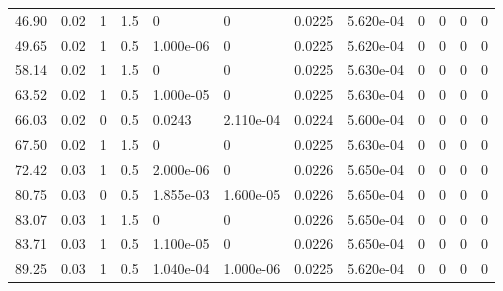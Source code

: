 \documentclass[preview]{standalone}
\begin{document}
{{\begin{tabular}{L{1.2cm}C{1.2cm} C{0.3cm}C{0.5cm} C{1.4cm}C{1.4cm} C{1.4cm}C{1.4cm} C{1.6cm}C{1.6cm} C{1.6cm}C{1.6cm}}
  46.90  &  0.02  & 1     & 1.5 &  0  & 0  &  0.0225&   5.620e-04& 0 & 0   &  0 & 0  \\ 
  49.65  &  0.02  & 1     & 0.5 &  1.000e-06  & 0  &  0.0225&   5.620e-04& 0 & 0   &  0 & 0  \\ 
  58.14  &  0.02  & 1     & 1.5 &  0  & 0  &  0.0225&   5.630e-04& 0 & 0   &  0 & 0  \\ 
  63.52  &  0.02  & 1     & 0.5 &  1.000e-05  & 0  &  0.0225&   5.630e-04& 0 & 0   &  0 & 0  \\ 
  66.03  &  0.02  & 0     & 0.5 &  0.0243  & 2.110e-04  &  0.0224&   5.600e-04& 0 & 0   &  0 & 0  \\ 
  67.50  &  0.02  & 1     & 1.5 &  0  & 0  &  0.0225&   5.630e-04& 0 & 0   &  0 & 0  \\ 
  72.42  &  0.03  & 1     & 0.5 &  2.000e-06  & 0  &  0.0226&   5.650e-04& 0 & 0   &  0 & 0  \\ 
  80.75  &  0.03  & 0     & 0.5 &  1.855e-03  & 1.600e-05  &  0.0226&   5.650e-04& 0 & 0   &  0 & 0  \\ 
  83.07  &  0.03  & 1     & 1.5 &  0  & 0  &  0.0226&   5.650e-04& 0 & 0   &  0 & 0  \\ 
  83.71  &  0.03  & 1     & 0.5 &  1.100e-05  & 0  &  0.0226&   5.650e-04& 0 & 0   &  0 & 0  \\ 
  89.25  &  0.03  & 1     & 0.5 &  1.040e-04  & 1.000e-06  &  0.0225&   5.620e-04& 0 & 0   &  0 & 0  \\ 
\hline 
\end{tabular} 

}}
\end{document}
